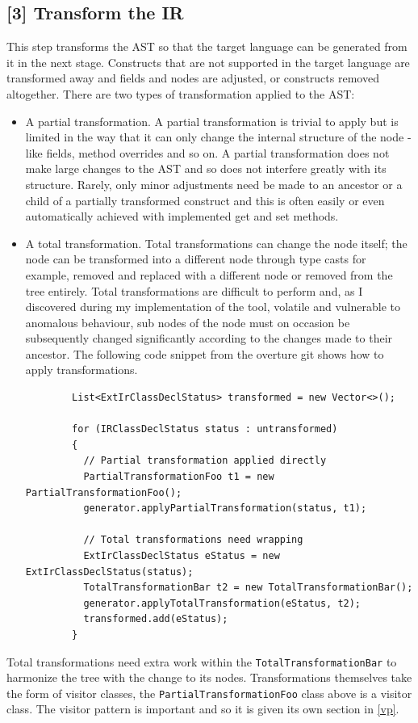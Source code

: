 	\subsection{	[3] Transform the IR} \label{ttir}
	This step transforms the AST so that the target language can be generated from it in the next stage. Constructs that are not supported in the target language are transformed away and fields and nodes are adjusted, or constructs removed altogether. There are two types of transformation applied to the AST: 
   	\begin{itemize}
	   \item A partial transformation. A partial transformation is trivial to apply but is limited in the way that it can only change the internal structure of the node - like fields, method overrides and so on. A partial transformation does not make large changes to the AST and so does not interfere greatly with its structure. Rarely, only minor adjustments need be made to an ancestor or a child of a partially transformed construct and this is often easily or even automatically achieved with implemented get and set methods.
	   \item A total transformation. Total transformations can change the node itself; the node can be transformed into a different node through type casts for example, removed and replaced with a different node or removed from the tree entirely. Total transformations are difficult to perform and, as I discovered during my implementation of the tool, volatile and vulnerable to anomalous behaviour, sub nodes of the node must on occasion be subsequently changed significantly according to the changes made to their ancestor. The following code snippet from the overture git shows how to apply transformations.
	   \begin{lstlisting}
	   	List<ExtIrClassDeclStatus> transformed = new Vector<>();

		for (IRClassDeclStatus status : untransformed)
		{
		  // Partial transformation applied directly
		  PartialTransformationFoo t1 = new PartialTransformationFoo();
		  generator.applyPartialTransformation(status, t1);

		  // Total transformations need wrapping
		  ExtIrClassDeclStatus eStatus = new ExtIrClassDeclStatus(status);
		  TotalTransformationBar t2 = new TotalTransformationBar();
		  generator.applyTotalTransformation(eStatus, t2);
		  transformed.add(eStatus);
		}
	  	\end{lstlisting}\parencite{vdmwikicgp}
 	\end{itemize}
	Total transformations need extra work within the \lstinline[language=Java]{TotalTransformationBar} to harmonize the tree with the change to its nodes. Transformations themselves take the form of visitor classes, the \lstinline[language=Java]{PartialTransformationFoo} class above is a visitor class. The visitor pattern is important and so it is given its own section in \ref{vp}.

